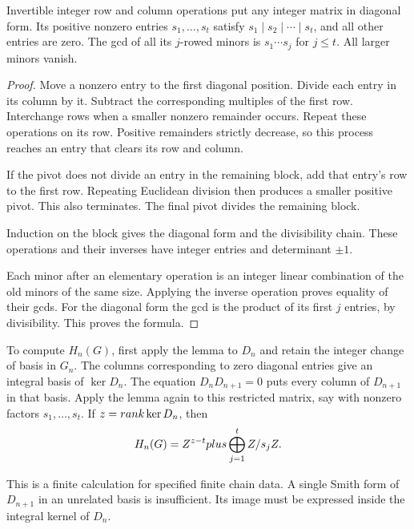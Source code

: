 \begin{lemma}\label{ntg:lem:smith}
Invertible integer row and column operations put any integer matrix
in diagonal form. Its positive nonzero entries $s_1,\ldots,s_t$ satisfy
$s_1\mid s_2\mid\cdots\mid s_t$, and all other entries are zero. The gcd of all its $j$-rowed minors is
$s_1\cdots s_j$ for $j\le t$. All larger minors vanish.
\end{lemma}

\begin{proof}
Move a nonzero entry to the first diagonal position.
Divide each entry in its column by it.
Subtract the corresponding multiples of the first row.
Interchange rows when a smaller nonzero remainder occurs.
Repeat these operations on its row. Positive remainders strictly decrease, so this
process reaches an entry that clears its row and column.

If the pivot does not divide an entry in the remaining block,
add that entry's row to the first row.
Repeating Euclidean division then produces a smaller positive pivot. This also terminates. The final pivot
divides the remaining block.

Induction on the block gives the diagonal
form and the divisibility chain. These operations and their inverses
have integer entries and determinant $\pm1$.

Each minor after an elementary operation is an integer linear
combination of the old minors of the same size. Applying the inverse
operation proves equality of their gcds. For the diagonal form the gcd
is the product of its first $j$ entries, by divisibility. This proves
the formula.
\end{proof}

To compute $H_n(G)$, first apply the lemma to $D_n$ and retain the
integer change of basis in $G_n$. The columns corresponding to zero
diagonal entries give an integral basis of $\ker D_n$. The equation
$D_nD_{n+1}=0$ puts every column of $D_{n+1}$ in that basis. Apply
the lemma again to this restricted matrix, say with nonzero factors
$s_1,\ldots,s_t$. If $z=rank\ker D_n$, then
\begin{equation}\label{ntg:eq:homology-algorithm}
 H_n(G)=Z^{z-t}plus\bigoplus_{j=1}^tZ/s_jZ.
\end{equation}

This is a finite calculation for specified finite chain data. A single
Smith form of $D_{n+1}$ in an unrelated basis is insufficient. Its
image must be expressed inside the integral kernel of $D_n$.

